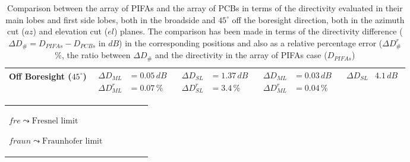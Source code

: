 \documentclass[10 pt,a4paper,twocolumn]{article}
\begin{document}
{\begin{table}[bt!]
\begin{center}
{\begin{tabular}{|m{3cm}|m{3.4cm}|m{3.4cm}|m{3.4cm}|m{3.4cm}|}
				\hline 
				Off Boresight ($45^\circ$) & 	
				$\begin{aligned}
					\Delta D_{ML}&=0.05\,dB\\
					\Delta D_{ML}^r&=0.07\,\%	
				\end{aligned}$
			& 	$\begin{aligned}
				\Delta D_{SL}&=1.37\,dB\\
				\Delta D_{SL}^r&=3.4\,\%\end{aligned}$
			& $\begin{aligned}
				\Delta D_{ML}&=0.03\,dB\\
			\Delta D_{ML}^r&=0.04\,\%\end{aligned}$	 
		& $\begin{aligned}
			\Delta D_{SL}&4.1\,dB\\
	\end{aligned}$	  \\
				\hline
		\end{tabular}}
		\caption{Comparison between the array of PIFAs and the array of PCBs in terms of the directivity evaluated in their main lobes and first side lobes, both in the broadside and $45^\circ$ off the boresight direction, both in the azimuth cut ($az$) and elevation cut ($el$) planes. The comparison has been made in terms of the directivity difference ($\Delta D_{\#}=D_{PIFAs}-D_{PCBs}$ in $dB$) in the corresponding positions and also as a relative percentage error ($\Delta D^r_{\#}$\%, the ratio between $\Delta D_{\#}$ and the directivity in the array of PIFAs case ($D_{PIFAs}$)}
		\label{table:array comparison error}
	\end{center}
\end{table}
\begin{table}[bt!]
	\begin{center}
			\small{\selectfont\begin{tabular}{|m{4cm}|m{2.6cm}|m{2cm}|m{2cm}|m{2.3cm}|m{2.3cm}|}
		
				\hline
				\rowcolor{deepsaffron} $fre\leadsto\text{Fresnel limit}$ 
							
				$fraun\leadsto\text{Fraunhofer limit}$
			

\end{tabular}}
\end{center}
\end{table}}
\end{document}
